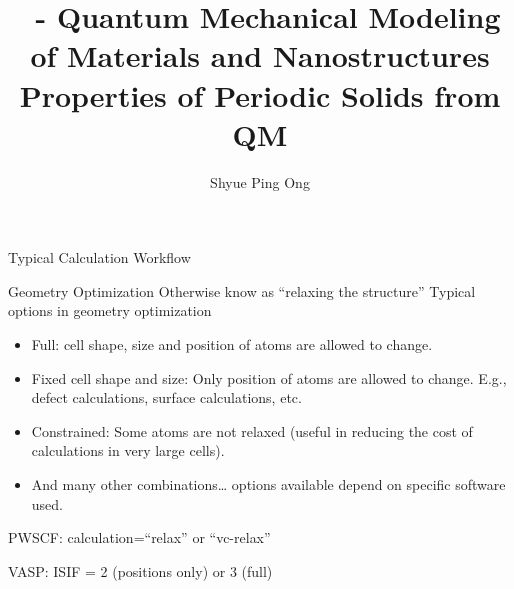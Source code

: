 \documentclass[aspectratio=169]{beamer}
\title[\classname Properties of Periodic Solids from QM]{\classname~- Quantum Mechanical Modeling of Materials and Nanostructures\\Properties of Periodic Solids from QM}
\author{Shyue Ping Ong}
\institute[UCSD]{University of California, San Diego\\
\medskip
}
\date{\classyear} %
\begin{document}
    \begin{frame}
        \titlepage %
    \end{frame}

\begin{frame}{Typical Calculation Workflow}
\begin{figure}
    \centering
\end{figure} 

\end{frame} 

\begin{frame}{Geometry Optimization}
Otherwise know as ``relaxing the structure''\newline
\newline
Typical options in geometry optimization
\begin{itemize}
    \item Full: cell shape, size and position of atoms are allowed to change.
    \item Fixed cell shape and size: Only position of atoms are allowed to change. E.g., defect calculations, surface calculations, etc.
    \item Constrained: Some atoms are not relaxed (useful in reducing the cost of calculations in very large cells).
    \item And many other combinations… options available depend on specific software used.
\end{itemize}

PWSCF: calculation=``relax'' or ``vc-relax''

VASP: ISIF = 2 (positions only) or 3 (full)

\end{frame} 
\end{document}
